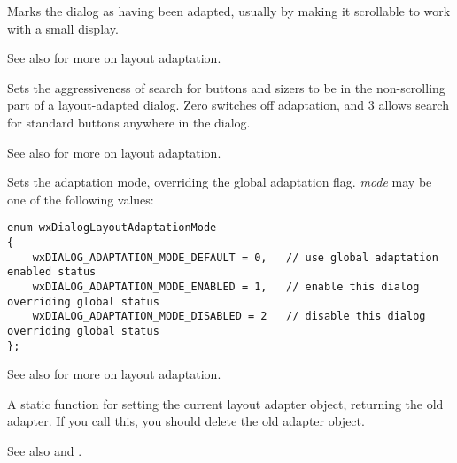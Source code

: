 Marks the dialog as having been adapted, usually by making it scrollable to work with a small display.

See also  for more on layout adaptation.


\label{wxdialogsetlayoutadaptationlevel}


Sets the aggressiveness of search for buttons and sizers to be in the non-scrolling part of a layout-adapted dialog.
Zero switches off adaptation, and 3 allows search for standard buttons anywhere in the dialog.

See also  for more on layout adaptation.


\label{wxdialogsetlayoutadaptationmode}


Sets the adaptation mode, overriding the global adaptation flag. {\it mode} may be one of the following values:

\begin{verbatim}
enum wxDialogLayoutAdaptationMode
{
    wxDIALOG_ADAPTATION_MODE_DEFAULT = 0,   // use global adaptation enabled status
    wxDIALOG_ADAPTATION_MODE_ENABLED = 1,   // enable this dialog overriding global status
    wxDIALOG_ADAPTATION_MODE_DISABLED = 2   // disable this dialog overriding global status
};
\end{verbatim}

See also  for more on layout adaptation.


\label{wxdialogsetlayoutadapter}


A static function for setting the current layout adapter object, returning the old adapter. If you call this, you should
delete the old adapter object.

See also  and .


\label{wxdialogsetmodal}

